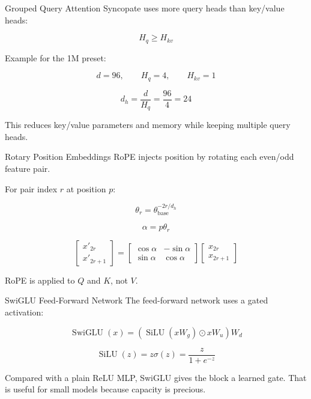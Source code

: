 \documentclass[aspectratio=169]{beamer}
\newcommand{\SiLU}{\operatorname{SiLU}}
\begin{document}
\begin{frame}{Grouped Query Attention}
  Syncopate uses more query heads than key/value heads:

  \[
    H_q \ge H_{kv}
  \]

  \vspace{0.5em}

  Example for the 1M preset:

  \[
    d = 96,\qquad H_q = 4,\qquad H_{kv} = 1
  \]

  \[
    d_h = \frac{d}{H_q} = \frac{96}{4} = 24
  \]

  \vspace{0.5em}

  This reduces key/value parameters and memory while keeping multiple query heads.
\end{frame}

\begin{frame}{Rotary Position Embeddings}
  RoPE injects position by rotating each even/odd feature pair.

  For pair index \(r\) at position \(p\):

  \[
    \theta_r = \theta_{\text{base}}^{-2r/d_h}
  \]

  \[
    \alpha = p\theta_r
  \]

  \[
    \begin{bmatrix}
      x'_{2r} \\
      x'_{2r+1}
    \end{bmatrix}
    =
    \begin{bmatrix}
      \cos \alpha & -\sin \alpha \\
      \sin \alpha & \cos \alpha
    \end{bmatrix}
    \begin{bmatrix}
      x_{2r} \\
      x_{2r+1}
    \end{bmatrix}
  \]

  RoPE is applied to \(Q\) and \(K\), not \(V\).
\end{frame}

\begin{frame}{SwiGLU Feed-Forward Network}
  The feed-forward network uses a gated activation:

  \[
    \operatorname{SwiGLU}(x)
    =
    \left(\SiLU(xW_g) \odot xW_u\right)W_d
  \]

  \[
    \SiLU(z) = z\sigma(z) = \frac{z}{1 + e^{-z}}
  \]

  \vspace{0.5em}

  Compared with a plain ReLU MLP, SwiGLU gives the block a learned gate.
  That is useful for small models because capacity is precious.
\end{frame}
\end{document}
